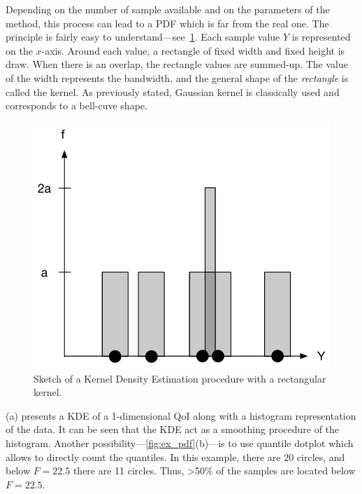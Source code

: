 Depending on the number of sample available and on the parameters of the method, this process can lead to a PDF which is far from the real one. The principle is fairly easy to understand---see~\cref{fig:kde}. Each sample value $Y$ is represented on the $x$-axis. Around each value, a rectangle of fixed width and fixed height is draw. When there is an overlap, the rectangle values are summed-up. The value of the width represents the bandwidth, and the general shape of the \emph{rectangle} is called the kernel. As previously stated, Gaussian kernel is classically used and corresponds to a bell-cuve shape.

\begin{figure}[!h]
\centering
\includegraphics[width=0.6\linewidth,keepaspectratio]{fig/literature/kde.pdf}
\caption{Sketch of a Kernel Density Estimation procedure with a rectangular kernel.}
\label{fig:kde}
\end{figure}

(a) presents a KDE of a 1-dimensional QoI along with a histogram representation of the data. It can be seen that the KDE act as a smoothing procedure of the histogram. Another possibility---\cref{fig:ex_pdf}(b)---is to use quantile dotplot \cite{kay2016} which allows to directly count the quantiles. In this example, there are 20 circles, and below $F=22.5$ there are 11 circles. Thus, >50\% of the samples are located below $F=22.5$.

